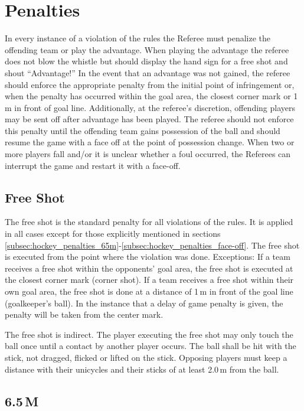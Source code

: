\section{Penalties}

In every instance of a violation of the rules the Referee must penalize the offending team or play the advantage.
When playing the advantage the referee does not blow the whistle but should display the hand sign for a free shot and shout “Advantage!”
In the event that an advantage was not gained, the referee should enforce the appropriate penalty from the initial point of infringement or, when the penalty has occurred within the goal area, the closest corner mark or 1 m in front of goal line.
Additionally, at the referee’s discretion, offending players may be sent off after advantage has been played.
The referee should not enforce this penalty until the offending team gains possession of the ball and should resume the game with a face off at the point of possession change.
When two or more players fall and/or it is unclear whether a foul occurred, the Referees can interrupt the game and restart it with a face-off.


\subsection{Free Shot}

The free shot is the standard penalty for all violations of the rules.
It is applied in all cases except for those explicitly mentioned in sections \ref{subsec:hockey_penalties_65m}-\ref{subsec:hockey_penalties_face-off}.
The free shot is executed from the point where the violation was done.
Exceptions: If a team receives a free shot within the opponents' goal area, the free shot is executed at the closest corner mark (corner shot).
If a team receives a free shot within their own goal area, the free shot is done at a distance of 1\,m in front of the goal line (goalkeeper's ball).
In the instance that a delay of game penalty is given, the penalty will be taken from the center mark.

The free shot is indirect.
The player executing the free shot may only touch the ball once until a contact by another player occurs.
The ball shall be hit with the stick, not dragged, flicked or lifted on the stick.
Opposing players must keep a distance with their unicycles and their sticks of at least 2.0\,m from the ball.

\subsection{6.5\,M \label{subsec:hockey_penalties_65m}}

